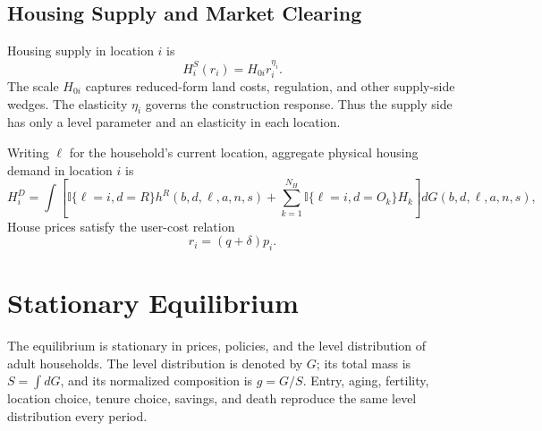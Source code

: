 \documentclass[11pt]{article}
\newcommand{\ind}{\mathbb{I}}
\begin{document}
\subsection{Housing Supply and Market Clearing}

Housing supply in location $i$ is
\begin{equation}
    H_i^S(r_i)
    =
    H_{0i} r_i^{\eta_i}.
    \label{eq:housing_supply}
\end{equation}
The scale $H_{0i}$ captures reduced-form land costs, regulation, and other supply-side wedges. The elasticity $\eta_i$ governs the construction response. Thus the supply side has only a level parameter and an elasticity in each location.

Writing $\ell$ for the household's current location, aggregate physical housing demand in location $i$ is
\begin{equation}
H_i^D
=
\int
\left[
\ind\{\ell=i,d=R\}h^R(b,d,\ell,a,n,s)
+
\sum_{k=1}^{N_H}
\ind\{\ell=i,d=O_k\}H_k
\right]dG(b,d,\ell,a,n,s),
\label{eq:housing_demand}
\end{equation}
House prices satisfy the user-cost relation
\begin{equation*}
    r_i=(q+\delta)p_i.
\end{equation*}

\section{Stationary Equilibrium}

The equilibrium is stationary in prices, policies, and the level distribution of adult households. The level distribution is denoted by $G$; its total mass is $S=\int dG$, and its normalized composition is $g=G/S$. Entry, aging, fertility, location choice, tenure choice, savings, and death reproduce the same level distribution every period.
\end{document}
